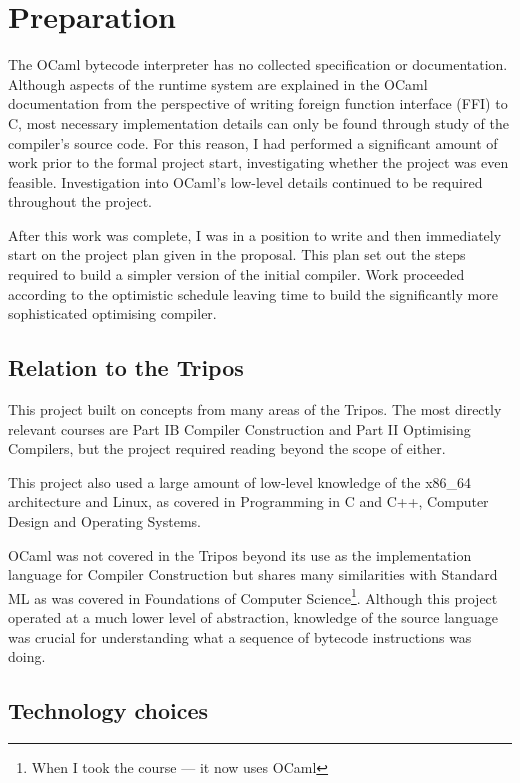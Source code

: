\chapter{Preparation}

The OCaml bytecode interpreter has no collected specification or documentation. Although aspects of
the runtime system are explained in the OCaml documentation from the perspective of writing foreign
function interface (FFI) to C, most necessary implementation details can only be found through
study
of the compiler's source
code. For this reason, I had performed a significant amount of work prior to the formal project
start,
investigating whether the project was even feasible. Investigation into OCaml's low-level details
continued to be required throughout the project.

After this work was complete, I was in a position to write and then immediately start on the
project
plan given in the proposal. This plan set out the steps required to build a simpler version of the
initial compiler. Work proceeded according to the optimistic schedule leaving time to build the
significantly more sophisticated optimising compiler.

\section{Relation to the Tripos}

This project built on concepts from many areas of the Tripos. The most directly
relevant courses are Part IB Compiler Construction and Part II Optimising Compilers, but the
project required
reading beyond the scope of either.

This project also used a large amount of low-level knowledge of the x86\_64 architecture and Linux,
as covered in Programming in C and C++, Computer Design and Operating Systems.

OCaml was not covered in the Tripos beyond its use as the implementation language for Compiler
Construction but shares many similarities with Standard ML as was covered in Foundations of
Computer
Science\footnote{When I took the course --- it now uses OCaml}. Although this project operated at a
much
lower level of abstraction, knowledge of the
source language was crucial for understanding what a sequence of bytecode instructions was doing.

\section{Technology choices}


